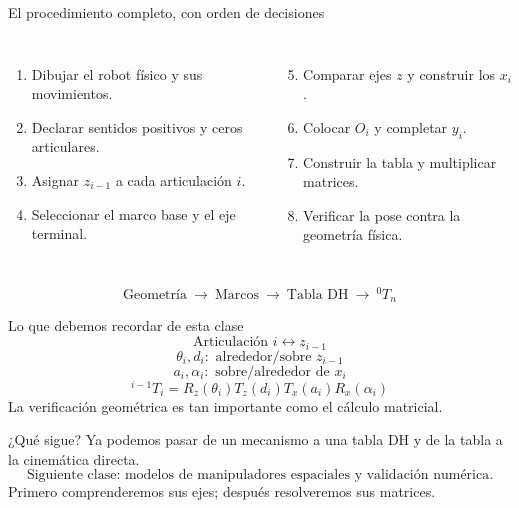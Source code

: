 \documentclass[aspectratio=169,11pt]{beamer}
\begin{document}
\begin{frame}[t]{El procedimiento completo, con orden de decisiones}
 \footnotesize
 \begin{columns}[T,onlytextwidth]
 \begin{enumerate}
  \item Dibujar el robot físico y sus movimientos.
  \item Declarar sentidos positivos y ceros articulares.
  \item Asignar $z_{i-1}$ a cada articulación $i$.
  \item Seleccionar el marco base y el eje terminal.
 \end{enumerate}
 \begin{enumerate}
  \setcounter{enumi}{4}
  \item Comparar ejes $z$ y construir los $x_i$.
  \item Colocar $O_i$ y completar $y_i$.
  \item Construir la tabla y multiplicar matrices.
  \item Verificar la pose contra la geometría física.
 \end{enumerate}
 \end{columns}
 \vspace{0.28cm}
 \[
 \boxed{\text{Geometría}\ \longrightarrow\ \text{Marcos}
 \ \longrightarrow\ \text{Tabla DH}\ \longrightarrow\ {}^0T_n}
 \]
\end{frame}

\begin{frame}[t]{Lo que debemos recordar de esta clase}
 \small
 \[
 \boxed{\text{Articulación }i\longleftrightarrow z_{i-1}}
 \]
 \pause
 \[
 \boxed{\theta_i,d_i:\text{ alrededor/sobre }z_{i-1}}
 \]
 \pause
 \[
 \boxed{a_i,\alpha_i:\text{ sobre/alrededor de }x_i}
 \]
 \pause
 \[
 \boxed{{}^{i-1}T_i=R_z(\theta_i)T_z(d_i)T_x(a_i)R_x(\alpha_i)}
 \]
 \small
 La verificación geométrica es tan importante como el cálculo matricial.
\end{frame}

\begin{frame}{¿Qué sigue?}
 \centering\vspace{0.30cm}
 {\Large Ya podemos pasar de un mecanismo a una tabla DH
 y de la tabla a la cinemática directa.}
 \vspace{0.37cm}
 \[
 \boxed{\text{Siguiente clase: modelos de manipuladores
 espaciales y validación numérica.}}
 \]
 \vspace{0.20cm}
 \small Primero comprenderemos sus ejes; después resolveremos sus matrices.
\end{frame}

\begin{frame}
 \centering
\end{frame}
\end{document}
